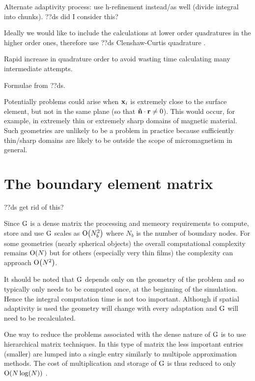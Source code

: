 Alternate adaptivity process: use h-refinement instead/as well (divide integral into chunks).
??ds did I consider this?

Ideally we would like to include the calculations at lower order quadratures in the higher order ones, therefore use ??ds Clenshaw-Curtis quadrature \cite{Trefethen2008}.

Rapid increase in quadrature order to avoid wasting time calculating many intermediate attempts.

Formulae from ??ds.

Potentially problems could arise when $\boldsymbol{\mathrm{x}}_i$ is extremely close to the surface element, but not in the same plane (so that $\boldsymbol{\mathrm{\hat{n}}} \cdot \boldsymbol{\mathrm{r}} \neq 0$).
This would occur, for example, in extremely thin or extremely sharp domains of magnetic material.
Such geometries are unlikely to be a problem in practice because sufficiently thin/sharp domains are likely to be outside the scope of micromagnetism in general.


\section{The boundary element matrix}
??ds get rid of this?

Since ${\mathbf{\mathrm{G}}}$ is a dense matrix the processing and memeory requirements to compute, store and use ${\mathbf{\mathrm{G}}}$ scales as $\mathrm{O}{\left( N_b^2 \right)}$ where $N_b$ is the number of boundary nodes. For some geometries (\eg nearly spherical objects) the overall computational complexity remains $\mathrm{O}{\left( N \right)}$ but for others (especially very thin films) the complexity can approach $\mathrm{O}{\left( N^2 \right)}$.

It should be noted that ${\mathbf{\mathrm{G}}}$ depends only on the geometry of the problem and so typically only needs to be computed once, at the beginning of the simulation. Hence the integral computation time is not too important. Although if spatial adaptivity is used the geometry will change with every adaptation and ${\mathbf{\mathrm{G}}}$ will need to be recalculated.

One way to reduce the problems associated with the dense nature of ${\mathbf{\mathrm{G}}}$ is to use hierarchical matrix techniques. In this type of matrix the less important entries (\ie smaller) are lumped into a single entry similarly to multipole approximation methods. The cost of multiplication and storage of ${\mathbf{\mathrm{G}}}$ is thus reduced to only $\mathrm{O}{\left( N \log(N) \right)}$ \cite{Knittel2009}.


